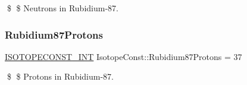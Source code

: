 \$ \$ Neutrons in Rubidium-\/87. \mbox{\label{group___isotope_const-_rubidium-_rb87_gae9ed825b67edb560dcbd2b7ea3a4ef0b}} 
\subsubsection{\texorpdfstring{Rubidium87\+Protons}{Rubidium87Protons}}
{\footnotesize\ttfamily \mbox{\hyperlink{group___isotope_const-_macros_ga5f18360b3e99483a35c32d789e62621c}{I\+S\+O\+T\+O\+P\+E\+C\+O\+N\+S\+T\+\_\+\+I\+NT}} Isotope\+Const\+::\+Rubidium87\+Protons = 37}

\$ \$ Protons in Rubidium-\/87. 